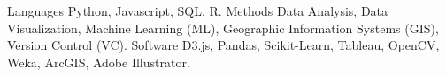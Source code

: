 \begin{cvskills}
  \cvskill
    {Languages}
    {Python, Javascript, SQL, R.}
\cvskill
    {Methods}
    {Data Analysis, Data Visualization, Machine Learning (ML), Geographic Information Systems (GIS), Version Control (VC).}
\cvskill
    {Software}
    {D3.js, Pandas, Scikit-Learn, Tableau, OpenCV, Weka, ArcGIS, Adobe Illustrator.}
\end{cvskills}
